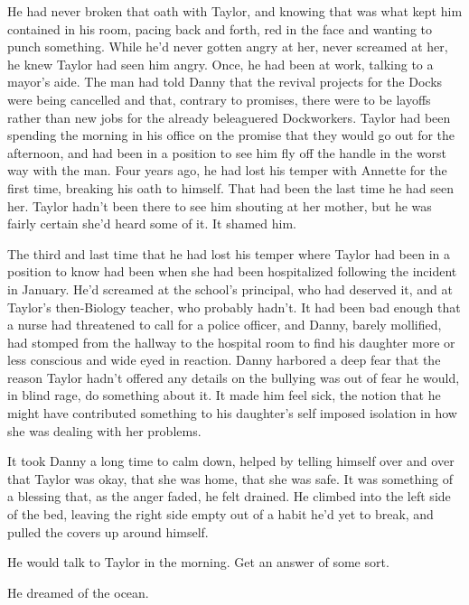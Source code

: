 He had never broken that oath with Taylor, and knowing that was what kept him contained in his room, pacing back and forth, red in the face and wanting to punch something.  While he'd never gotten angry at her, never screamed at her, he knew Taylor had seen him angry.  Once, he had been at work, talking to a mayor's aide.  The man had told Danny that the revival projects for the Docks were being cancelled and that, contrary to promises, there were to be layoffs rather than new jobs for the already beleaguered Dockworkers.  Taylor had been spending the morning in his office on the promise that they would go out for the afternoon, and had been in a position to see him fly off the handle in the worst way with the man.  Four years ago, he had lost his temper with Annette for the first time, breaking his oath to himself.  That had been the last time he had seen her.  Taylor hadn't been there to see him shouting at her mother, but he was fairly certain she'd heard some of it.  It shamed him.



The third and last time that he had lost his temper where Taylor had been in a position to know had been when she had been hospitalized following the incident in January.  He'd screamed at the school's principal, who had deserved it, and at Taylor's then-Biology teacher, who probably hadn't.  It had been bad enough that a nurse had threatened to call for a police officer, and Danny, barely mollified, had stomped from the hallway to the hospital room to find his daughter more or less conscious and wide eyed in reaction.  Danny harbored a deep fear that the reason Taylor hadn't offered any details on the bullying was out of fear he would, in blind rage, do something about it.  It made him feel sick, the notion that he might have contributed something to his daughter's self imposed isolation in how she was dealing with her problems.



It took Danny a long time to calm down, helped by telling himself over and over that Taylor was okay, that she was home, that she was safe.  It was something of a blessing that, as the anger faded, he felt drained.  He climbed into the left side of the bed, leaving the right side empty out of a habit he'd yet to break, and pulled the covers up around himself.



He would talk to Taylor in the morning.  Get an answer of some sort.



He dreamed of the ocean.





